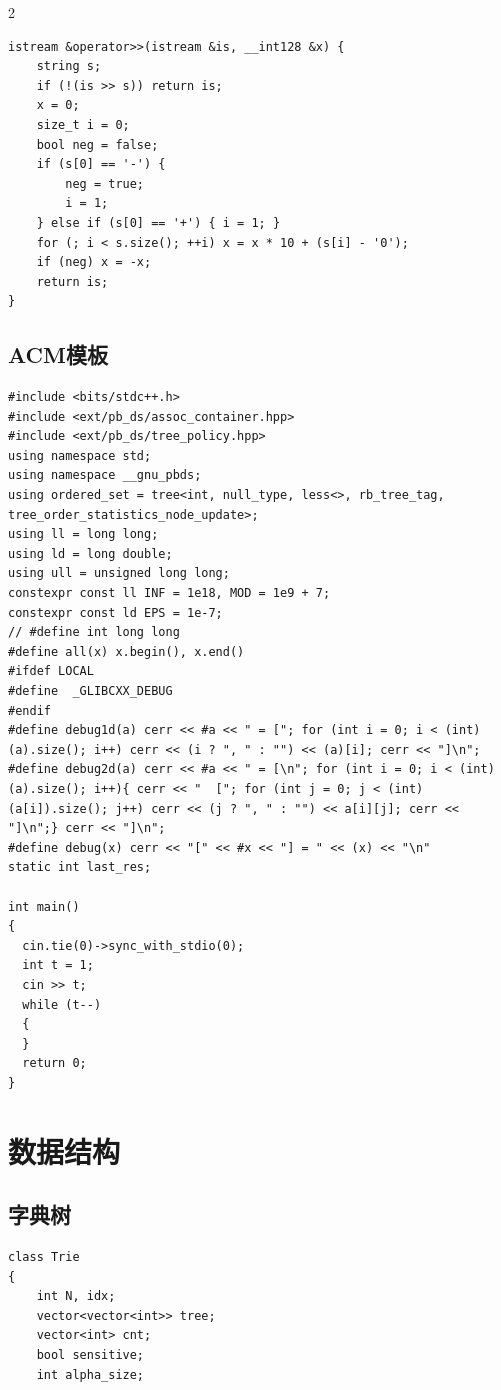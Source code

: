 \documentclass[10pt]{article}
\begin{document}
\begin{multicols*}{2}
\begin{verbatim}
istream &operator>>(istream &is, __int128 &x) {
    string s;
    if (!(is >> s)) return is;
    x = 0;
    size_t i = 0;
    bool neg = false;
    if (s[0] == '-') {
        neg = true;
        i = 1;
    } else if (s[0] == '+') { i = 1; }
    for (; i < s.size(); ++i) x = x * 10 + (s[i] - '0');
    if (neg) x = -x;
    return is;
}
\end{verbatim}




\subsection{ACM模板}


\begin{verbatim}
#include <bits/stdc++.h>
#include <ext/pb_ds/assoc_container.hpp>
#include <ext/pb_ds/tree_policy.hpp>
using namespace std;
using namespace __gnu_pbds;
using ordered_set = tree<int, null_type, less<>, rb_tree_tag, tree_order_statistics_node_update>;
using ll = long long;
using ld = long double;
using ull = unsigned long long;
constexpr const ll INF = 1e18, MOD = 1e9 + 7;
constexpr const ld EPS = 1e-7;
// #define int long long
#define all(x) x.begin(), x.end()
#ifdef LOCAL
#define  _GLIBCXX_DEBUG
#endif
#define debug1d(a) cerr << #a << " = ["; for (int i = 0; i < (int)(a).size(); i++) cerr << (i ? ", " : "") << (a)[i]; cerr << "]\n";
#define debug2d(a) cerr << #a << " = [\n"; for (int i = 0; i < (int)(a).size(); i++){ cerr << "  ["; for (int j = 0; j < (int)(a[i]).size(); j++) cerr << (j ? ", " : "") << a[i][j]; cerr << "]\n";} cerr << "]\n";
#define debug(x) cerr << "[" << #x << "] = " << (x) << "\n"
static int last_res;

int main()
{
  cin.tie(0)->sync_with_stdio(0);
  int t = 1;
  cin >> t;
  while (t--)
  {
  }
  return 0;
}
\end{verbatim}




\section{数据结构}


\subsection{字典树}


\begin{verbatim}
class Trie
{
    int N, idx;
    vector<vector<int>> tree;
    vector<int> cnt;
    bool sensitive;
    int alpha_size;


\end{verbatim}
\end{multicols*}
\end{document}

